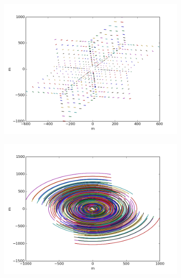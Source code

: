 \begin{figure}[h]
\begin{mdframed}
\begin{subfigure}[b]{0.3\textwidth}
  \caption{}
 \end{subfigure}
 \begin{subfigure}[b]{0.3\textwidth}
  \includegraphics[width=\textwidth]{images/evla_observation/5min_snapshot_ncp.png}
  \caption{}
 \end{subfigure}
 \begin{subfigure}[b]{0.3\textwidth}
  \includegraphics[width=\textwidth]{images/evla_observation/6hr_ncp.png}
  \caption{}
 \end{subfigure}
 \begin{subfigure}[b]{0.3\textwidth}

\end{subfigure}
\end{mdframed}
\end{figure}
